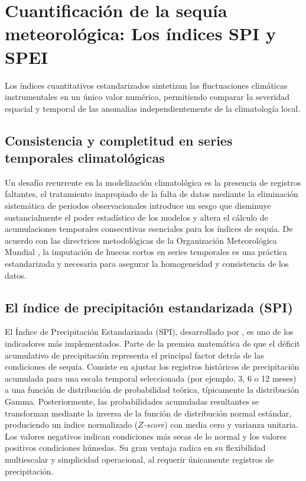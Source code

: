 \section{Cuantificación de la sequía meteorológica: Los índices SPI y SPEI}

Los índices cuantitativos estandarizados sintetizan las fluctuaciones climáticas instrumentales en un único valor numérico, permitiendo comparar la severidad espacial y temporal de las anomalías independientemente de la climatología local.

\subsection[Consistencia y completitud en series temporales]{Consistencia y completitud en series temporales climatológicas}
\sloppy
Un desafío recurrente en la modelización climatológica es la presencia de registros faltantes, el tratamiento inapropiado de la falta de datos mediante la eliminación sistemática de periodos observacionales introduce un sesgo que disminuye sustancialmente el poder estadístico de los modelos y altera el cálculo de acumulaciones temporales consecutivas esenciales para los índices de sequía. De acuerdo con las directrices metodológicas de la Organización Meteorológica Mundial \cite{wmo2017}, la imputación de huecos cortos en series temporales es una práctica estandarizada y necesaria para asegurar la homogeneidad y consistencia de los datos.

\subsection{El índice de precipitación estandarizada (SPI)}

El Índice de Precipitación Estandarizada (SPI), desarrollado por , es uno de los indicadores más implementados. Parte de la premisa matemática de que el déficit acumulativo de precipitación representa el principal factor detrás de las condiciones de sequía. Consiste en ajustar los registros históricos de precipitación acumulada para una escala temporal seleccionada (por ejemplo, 3, 6 o 12 meses) a una función de distribución de probabilidad teórica, típicamente la distribución Gamma. Posteriormente, las probabilidades acumuladas resultantes se transforman mediante la inversa de la función de distribución normal estándar, produciendo un índice normalizado (\textit{$Z$-score}) con media cero y varianza unitaria. Los valores negativos indican condiciones más secas de lo normal y los valores positivos condiciones húmedas. Su gran ventaja radica en su flexibilidad multiescalar y simplicidad operacional, al requerir únicamente registros de precipitación.

